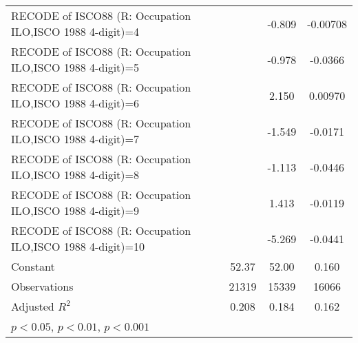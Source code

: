 \begin{table}[htbp]
\begin{tabular}{l*{3}{c}}
RECODE of ISCO88 (R: Occupation ILO,ISCO 1988 4-digit)=4&                     &      -0.809         &    -0.00708         \\
RECODE of ISCO88 (R: Occupation ILO,ISCO 1988 4-digit)=5&                     &      -0.978         &     -0.0366\sym{**} \\
RECODE of ISCO88 (R: Occupation ILO,ISCO 1988 4-digit)=6&                     &       2.150         &     0.00970         \\
RECODE of ISCO88 (R: Occupation ILO,ISCO 1988 4-digit)=7&                     &      -1.549         &     -0.0171         \\
RECODE of ISCO88 (R: Occupation ILO,ISCO 1988 4-digit)=8&                     &      -1.113         &     -0.0446\sym{**} \\
RECODE of ISCO88 (R: Occupation ILO,ISCO 1988 4-digit)=9&                     &       1.413         &     -0.0119         \\
RECODE of ISCO88 (R: Occupation ILO,ISCO 1988 4-digit)=10&                     &      -5.269         &     -0.0441         \\
Constant            &       52.37\sym{***}&       52.00\sym{***}&       0.160\sym{***}\\
\hline
Observations        &       21319         &       15339         &       16066         \\
Adjusted \(R^{2}\)  &       0.208         &       0.184         &       0.162         \\
\hline\hline
\multicolumn{4}{l}{\footnotesize \sym{*} \(p<0.05\), \sym{**} \(p<0.01\), \sym{***} \(p<0.001\)}\\
\end{tabular}
\end{table}
